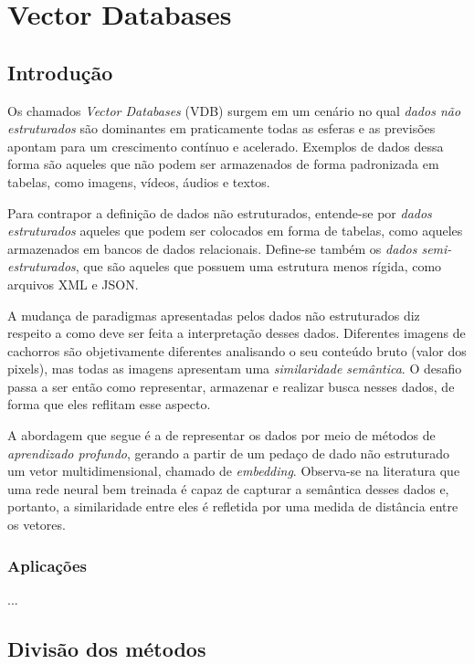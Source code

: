\chapter{Vector Databases}

\section{Introdução}

Os chamados \textit{Vector Databases} (VDB) surgem em um cenário no qual \textit{dados não estruturados} são dominantes em praticamente todas as esferas e as previsões apontam para um crescimento contínuo e acelerado. Exemplos de dados dessa forma são aqueles que não podem ser armazenados de forma padronizada em tabelas, como imagens, vídeos, áudios e textos.

Para contrapor a definição de dados não estruturados, entende-se por \textit{dados estruturados} aqueles que podem ser colocados em forma de tabelas, como aqueles armazenados em bancos de dados relacionais. Define-se também os \textit{dados semi-estruturados}, que são aqueles que possuem uma estrutura menos rígida, como arquivos XML e JSON.

A mudança de paradigmas apresentadas pelos dados não estruturados diz respeito a como deve ser feita a interpretação desses dados. Diferentes imagens de cachorros são objetivamente diferentes analisando o seu conteúdo bruto (valor dos pixels), mas todas as imagens apresentam uma \textit{similaridade semântica}. O desafio passa a ser então como representar, armazenar e realizar busca nesses dados, de forma que eles reflitam esse aspecto.

A abordagem que segue é a de representar os dados por meio de métodos de \textit{aprendizado profundo}, gerando a partir de um pedaço de dado não estruturado um vetor multidimensional, chamado de \textit{embedding}. Observa-se na literatura que uma rede neural bem treinada é capaz de capturar a semântica desses dados e, portanto, a similaridade entre eles é refletida por uma medida de distância entre os vetores.

\subsection{Aplicações}

...

\section{Divisão dos métodos}


